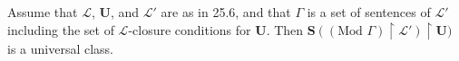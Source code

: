 Assume that $\mathcal{L}$, $\mathbf{U}$, and $\mathcal{L}'$ are as in 25.6, and that $\Gamma$ is a set of sentences of $\mathcal{L}'$ including the set of $\mathcal{L}$-closure conditions for $\mathbf{U}$. Then $\mathbf{S}((\text{Mod } \Gamma) \upharpoonright \mathcal{L}') \upharpoonright \mathbf{U})$ is a universal class.
